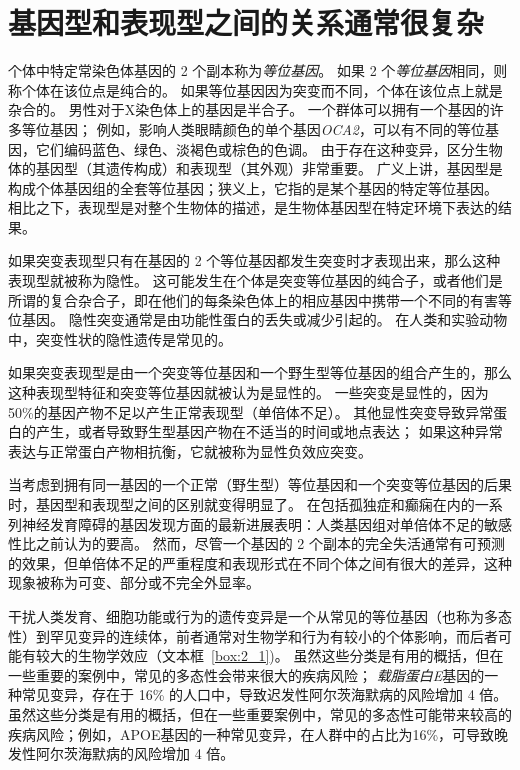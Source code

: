 \section{基因型和表现型之间的关系通常很复杂}

个体中特定常染色体基因的 2 个副本称为\textit{等位基因}。
如果 2 个\textit{等位基因}相同，则称个体在该位点是纯合的。
如果等位基因因为突变而不同，个体在该位点上就是杂合的。
男性对于X染色体上的基因是半合子。
一个群体可以拥有一个基因的许多等位基因；
例如，影响人类眼睛颜色的单个基因\textit{OCA2}，可以有不同的等位基因，它们编码蓝色、绿色、淡褐色或棕色的色调。
由于存在这种变异，区分生物体的基因型（其遗传构成）和表现型（其外观）非常重要。
广义上讲，基因型是构成个体基因组的全套等位基因；狭义上，它指的是某个基因的特定等位基因。
相比之下，表现型是对整个生物体的描述，是生物体基因型在特定环境下表达的结果。


如果突变表现型只有在基因的 2 个等位基因都发生突变时才表现出来，那么这种表现型就被称为隐性。
这可能发生在个体是突变等位基因的纯合子，或者他们是所谓的复合杂合子，即在他们的每条染色体上的相应基因中携带一个不同的有害等位基因。
隐性突变通常是由功能性蛋白的丢失或减少引起的。
在人类和实验动物中，突变性状的隐性遗传是常见的。


如果突变表现型是由一个突变等位基因和一个野生型等位基因的组合产生的，那么这种表现型特征和突变等位基因就被认为是显性的。
一些突变是显性的，因为50\%的基因产物不足以产生正常表现型（单倍体不足）。
其他显性突变导致异常蛋白的产生，或者导致野生型基因产物在不适当的时间或地点表达；
如果这种异常表达与正常蛋白产物相抗衡，它就被称为显性负效应突变。


当考虑到拥有同一基因的一个正常（野生型）等位基因和一个突变等位基因的后果时，基因型和表现型之间的区别就变得明显了。
在包括孤独症和癫痫在内的一系列神经发育障碍的基因发现方面的最新进展表明：人类基因组对单倍体不足的敏感性比之前认为的要高。
然而，尽管一个基因的 2 个副本的完全失活通常有可预测的效果，但单倍体不足的严重程度和表现形式在不同个体之间有很大的差异，这种现象被称为可变、部分或不完全外显率。


干扰人类发育、细胞功能或行为的遗传变异是一个从常见的等位基因（也称为多态性）到罕见变异的连续体，前者通常对生物学和行为有较小的个体影响，而后者可能有较大的生物学效应（文本框~\ref{box:2_1})。
虽然这些分类是有用的概括，但在一些重要的案例中，常见的多态性会带来很大的疾病风险；
\textit{载脂蛋白E}基因的一种常见变异，存在于 16\% 的人口中，导致迟发性阿尔茨海默病的风险增加 4 倍。
虽然这些分类是有用的概括，但在一些重要案例中，常见的多态性可能带来较高的疾病风险；例如，APOE基因的一种常见变异，在人群中的占比为16\%，可导致晚发性阿尔茨海默病的风险增加 4 倍。



